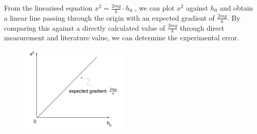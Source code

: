 From the linearised equation $x^2=\frac{2mg}{k}\cdot h_0$ , we can plot $x^2$ against $h_0$ and obtain a linear line passing through the origin with an expected gradient of $\frac{2mg}{k}$. By comparing this against a directly calculated value of $\frac{2mg}{k}$ through direct measurement and literature value, we can determine the experimental error.
\FloatBarrier
\begin{figure}[!htb]
    \begin{center}
        \includegraphics[width = 200px]{grad.png}
    \end{center}
\end{figure}
\FloatBarrier